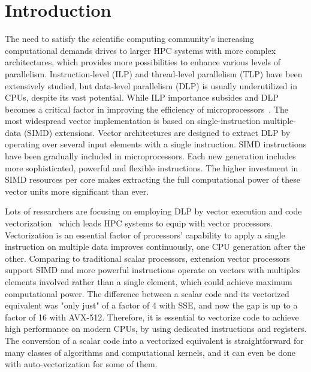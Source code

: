 \documentclass[sigconf,review]{acmart}
\begin{document}
\section{Introduction}\label{sec:intro}
The need to satisfy the scientific computing community's increasing
computational demands drives to larger HPC systems with more complex architectures,
which provides more possibilities to enhance various levels of parallelism.
%
Instruction-level (ILP) and thread-level parallelism (TLP) have been extensively
studied, but data-level parallelism (DLP) is usually underutilized in CPUs, despite its vast potential.
While ILP importance subsides and DLP becomes a critical
factor in improving the efficiency of
microprocessors~\cite{energy_effects, AVX_extensions, Hardware_Events, espasa1998vector, Watson1972TheTA, cluster_efficiency}.
The most widespread vector implementation is based on single-instruction multiple-data (SIMD) extensions.
Vector architectures are designed to extract DLP by operating over several input elements with a single instruction.
SIMD instructions have been gradually included in
microprocessors. Each new generation includes more sophisticated, powerful and flexible
instructions. The higher investment in SIMD resources per core makes extracting the
full computational power of these vector units more significant than ever.

Lots of researchers are focusing on employing DLP by vector
execution and code vectorization~\cite{Vectorizing_Compilers1,Vectorizing-Compilers,vectorize_11,vectorizingcompilers,SIMD_Vector_Operations} which leads HPC
systems to equip with vector processors.
Vectorization is an essential factor of processors' capability to apply
a single instruction on multiple data improves
continuously, one CPU generation after the other.
Comparing to traditional scalar processors, extension vector processors support
SIMD and more powerful instructions operate
on vectors with multiples elements involved rather than a single element, which
could achieve maximum computational power.
The difference between a scalar code and its vectorized equivalent
was "only just" of a factor of 4 with SSE, and now the
gap is up to a factor of 16 with AVX-512. Therefore, it is essential to
vectorize code to achieve high performance on modern CPUs, by using dedicated instructions
and registers. The conversion of a scalar code into a vectorized
equivalent is straightforward for many classes of algorithms
and computational kernels, and it can even be done with auto-vectorization for some of them.
%
\end{document}
